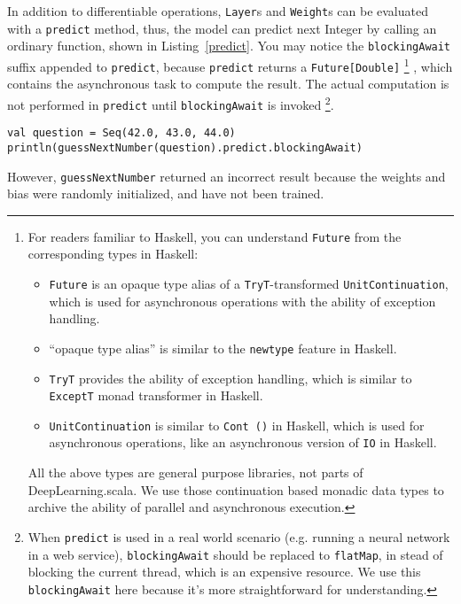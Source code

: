 In addition to differentiable operations, \lstinline{Layer}s and \lstinline{Weight}s can be evaluated with a \lstinline{predict} method, thus, the model can predict next Integer by calling an ordinary function, shown in Listing~\ref{predict}. 
You may notice the \lstinline{blockingAwait} suffix appended to \lstinline{predict}, because \lstinline{predict} returns a \lstinline{Future[Double]}
\footnote{ 
  For readers familiar to Haskell, you can understand \lstinline{Future} from the corresponding types in Haskell:
  \begin{itemize}
    \item \lstinline{Future} is an opaque type alias of a \lstinline{TryT}-transformed \lstinline{UnitContinuation}, which is used for asynchronous operations with the ability of exception handling.
    \item ``opaque type alias'' is similar to the \lstinline{newtype} feature in Haskell.
    \item \lstinline{TryT} provides the ability of exception handling, which is similar to \lstinline{ExceptT} monad transformer in Haskell.
    \item \lstinline{UnitContinuation} is similar to \lstinline{Cont ()} in Haskell, which is used for asynchronous operations, like an asynchronous version of \lstinline{IO} in Haskell.
  \end{itemize}
  All the above types are general purpose libraries, not parts of DeepLearning.scala. We use those continuation based monadic data types to archive the ability of parallel and asynchronous execution.
}
, which contains the asynchronous task to compute the result. The actual computation is not performed in  \lstinline{predict} until \lstinline{blockingAwait} is invoked \footnote{
  When \lstinline{predict} is used in a real world scenario (e.g. running a neural network in a web service), \lstinline{blockingAwait} should be replaced to \lstinline{flatMap}, in stead of blocking the current thread, which is an expensive resource. We use this \lstinline{blockingAwait} here because it's more straightforward for understanding.
}.

\begin{lstlisting}[float={h t b p},caption={Inference on an untrained model},label={predict}]
val question = Seq(42.0, 43.0, 44.0)
println(guessNextNumber(question).predict.blockingAwait)
\end{lstlisting}

However, \lstinline{guessNextNumber} returned an incorrect result because the weights and bias were randomly initialized, and have not been trained.

